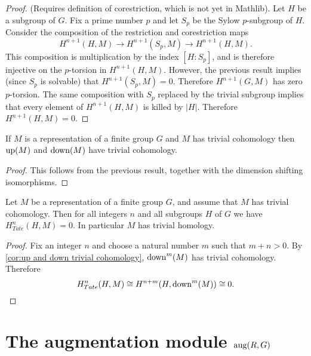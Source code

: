 \begin{proof}
	(Requires definition of corestriction, which is not yet in Mathlib).
	Let $H$ be a subgroup of $G$.
	Fix a prime number $p$ and let $S_p$ be the Sylow $p$-subgroup of $H$.
	Consider the composition of the restriction and corestriction maps
	\[
		H^{n+1}(H,M) \to H^{n+1}(S_p,M) \to H^{n+1}(H,M).
	\]
	This composition is multiplication by the index $[H:S_p]$,
	and is therefore injective on the $p$-torsion
	in $H^{n+1}(H,M)$.
	However, the previous result implies (since $S_p$ is solvable) that $H^{n+1}(S_p,M)=0$.
	Therefore $H^{n+1}(G,M)$ has zero $p$-torsion.
	The same composition with $S_p$ replaced by the trivial subgroup implies that every element
	of $H^{n+1}(H,M)$ is killed by $|H|$.
	Therefore $H^{n+1}(H,M) = 0$.
\end{proof}


\begin{corollary}
	\label{cor:up and down trivial cohomology}
	If $M$ is a representation of a finite group $G$ and $M$ has trivial cohomology
	then $\mathrm{up}(M)$ and $\mathrm{down}(M)$ have trivial cohomology.
\end{corollary}

\begin{proof}
	This follows from the previous result, together with the dimension shifting isomorphisms.
\end{proof}

\begin{theorem}
	Let $M$ be a representation of a finite group $G$, and assume that $M$ has trivial cohomology.
	Then for all integers $n$ and all subgroups $H$ of $G$ we have $H^n_{Tate}(H,M)=0$.
	In particular $M$ has trivial homology.
\end{theorem}

\begin{proof}
	Fix an integer $n$ and choose a natural number $m$ such that $m + n > 0$.
	By \ref{cor:up and down trivial cohomology}, $\mathrm{down}^m(M)$ has trivial cohomology.
	Therefore
	\[
		H^n_{Tate}(H,M) \cong H^{n+m}(H, \mathrm{down}^m(M)) \cong 0.
	\]
\end{proof}



\section{The augmentation module $\mathrm{aug}(R,G)$}

